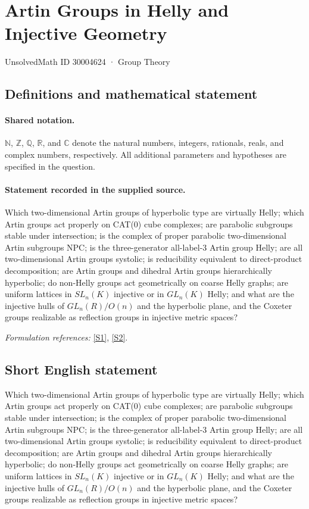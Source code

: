 \documentclass[11pt]{article}
\newcommand{\sref}[2]{\hyperlink{source:#1:#2}{[S#2]}}
\begin{document}
\setcounter{section}{30004623}
\section{Artin Groups in Helly and Injective Geometry}\label{30004624}
{\small UnsolvedMath ID 30004624 · Group Theory}
\subsection{Definitions and mathematical statement}

\paragraph{Shared notation.}$\mathbb N$, $\mathbb Z$, $\mathbb Q$, $\mathbb R$, and $\mathbb C$ denote the natural numbers, integers, rationals, reals, and complex numbers, respectively. All additional parameters and hypotheses are specified in the question.


\paragraph{Statement recorded in the supplied source.}
Which two-dimensional Artin groups of hyperbolic type are virtually Helly; which Artin groups act properly on CAT(0) cube complexes; are parabolic subgroups stable under intersection; is the complex of proper parabolic two-dimensional Artin subgroups NPC; is the three-generator all-label-3 Artin group Helly; are all two-dimensional Artin groups systolic; is reducibility equivalent to direct-product decomposition; are Artin groups and dihedral Artin groups hierarchically hyperbolic; do non-Helly groups act geometrically on coarse Helly graphs; are uniform lattices in $SL_n(K)$ injective or in $GL_n(K)$ Helly; and what are the injective hulls of $GL_n(R)/O(n)$ and the hyperbolic plane, and the Coxeter groups realizable as reflection groups in injective metric spaces?
\par\smallskip\textit{Formulation references:} \sref{30004624}{1}, \sref{30004624}{2}.
\subsection{Short English statement}
Which two-dimensional Artin groups of hyperbolic type are virtually Helly; which Artin groups act properly on CAT(0) cube complexes; are parabolic subgroups stable under intersection; is the complex of proper parabolic two-dimensional Artin subgroups NPC; is the three-generator all-label-3 Artin group Helly; are all two-dimensional Artin groups systolic; is reducibility equivalent to direct-product decomposition; are Artin groups and dihedral Artin groups hierarchically hyperbolic; do non-Helly groups act geometrically on coarse Helly graphs; are uniform lattices in $SL_n(K)$ injective or in $GL_n(K)$ Helly; and what are the injective hulls of $GL_n(R)/O(n)$ and the hyperbolic plane, and the Coxeter groups realizable as reflection groups in injective metric spaces?
\end{document}
